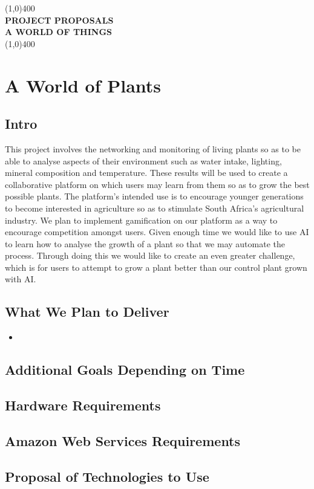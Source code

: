 \documentclass{article}
\begin{document}
\begin{titlepage}
	\begin{center}
		\line(1,0){400}\\
		[6mm]
		\huge{\bfseries PROJECT PROPOSALS\\A WORLD OF THINGS}\\
		\line(1,0){400}\\
	\end{center}
\end{titlepage}

\section{A World of Plants}
	\subsection{Intro}
		This project involves the networking and monitoring of living plants so as to be able to analyse aspects of their environment such as water intake, lighting, mineral composition and temperature. These results will be used to create a collaborative platform on which users may learn from them so as to grow the best possible plants. The platform's intended use is to encourage younger generations to become interested in agriculture so as to stimulate South Africa's agricultural industry. We plan to implement gamification on our platform as a way to encourage competition amongst users. Given enough time we would like to use AI to learn how to analyse the growth of a plant so that we may automate the process. Through doing this we would like to create an even greater challenge, which is for users to attempt to grow a plant better than our control plant grown with AI.
	\subsection{What We Plan to Deliver}
		\begin{itemize}
			\item
		\end{itemize}
	\subsection{Additional Goals Depending on Time}
	\subsection{Hardware Requirements}
	\subsection{Amazon Web Services Requirements}
	\subsection{Proposal of Technologies to Use}
\end{document}
